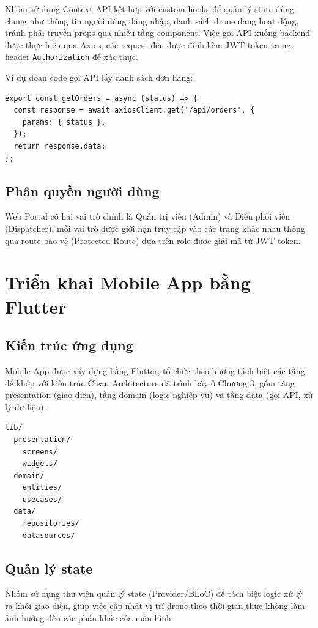 Nhóm sử dụng Context API kết hợp với custom hooks để quản lý state dùng chung như thông tin người dùng đăng nhập, danh sách drone đang hoạt động, tránh phải truyền props qua nhiều tầng component. Việc gọi API xuống backend được thực hiện qua Axios, các request đều được đính kèm JWT token trong header \texttt{Authorization} để xác thực.

Ví dụ đoạn code gọi API lấy danh sách đơn hàng:

\begin{verbatim}
export const getOrders = async (status) => {
  const response = await axiosClient.get('/api/orders', {
    params: { status },
  });
  return response.data;
};
\end{verbatim}

\subsection{Phân quyền người dùng}

Web Portal có hai vai trò chính là Quản trị viên (Admin) và Điều phối viên (Dispatcher), mỗi vai trò được giới hạn truy cập vào các trang khác nhau thông qua route bảo vệ (Protected Route) dựa trên role được giải mã từ JWT token.

\section{Triển khai Mobile App bằng Flutter}

\subsection{Kiến trúc ứng dụng}

Mobile App được xây dựng bằng Flutter, tổ chức theo hướng tách biệt các tầng để khớp với kiến trúc Clean Architecture đã trình bày ở Chương 3, gồm tầng presentation (giao diện), tầng domain (logic nghiệp vụ) và tầng data (gọi API, xử lý dữ liệu).

\begin{verbatim}
lib/
  presentation/
    screens/
    widgets/
  domain/
    entities/
    usecases/
  data/
    repositories/
    datasources/
\end{verbatim}

\subsection{Quản lý state}

Nhóm sử dụng thư viện quản lý state (Provider/BLoC) để tách biệt logic xử lý ra khỏi giao diện, giúp việc cập nhật vị trí drone theo thời gian thực không làm ảnh hưởng đến các phần khác của màn hình.

